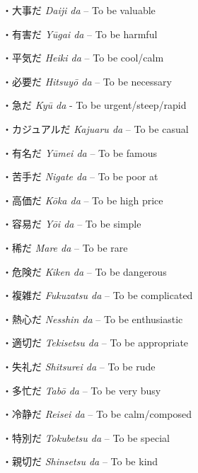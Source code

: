 \par{・大事だ \emph{Daiji da }– To be valuable }
 
\par{・有害だ \emph{Yūgai da }– To be harmful }
 
\par{・平気だ \emph{Heiki da }– To be cool\slash calm }
 
\par{・必要だ \emph{Hitsuyō da }– To be necessary }
 
\par{・急だ \emph{Kyū da }- To be urgent\slash steep\slash rapid }
 
\par{・カジュアルだ \emph{Kajuaru da }– To be casual }
 
\par{・有名だ \emph{Yūmei da }– To be famous }
 
\par{・苦手だ \emph{Nigate da }– To be poor at }
 
\par{・高価だ \emph{Kōka da }– To be high price }
 
\par{・容易だ \emph{Yōi da }– To be simple }
 
\par{・稀だ \emph{Mare da }– To be rare }
 
\par{・危険だ \emph{Kiken da }– To be dangerous }
 
\par{・複雑だ \emph{Fukuzatsu da }– To be complicated }
 
\par{・熱心だ \emph{Nesshin da }– To be enthusiastic }
 
\par{・適切だ \emph{Tekisetsu da }– To be appropriate }
 
\par{・失礼だ \emph{Shitsurei da }– To be rude }
 
\par{・多忙だ \emph{Tabō da }– To be very busy }
 
\par{・冷静だ \emph{Reisei da }– To be calm\slash composed }
 
\par{・特別だ \emph{Tokubetsu da }– To be special }
 
\par{・親切だ \emph{Shinsetsu da }– To be kind }
 
